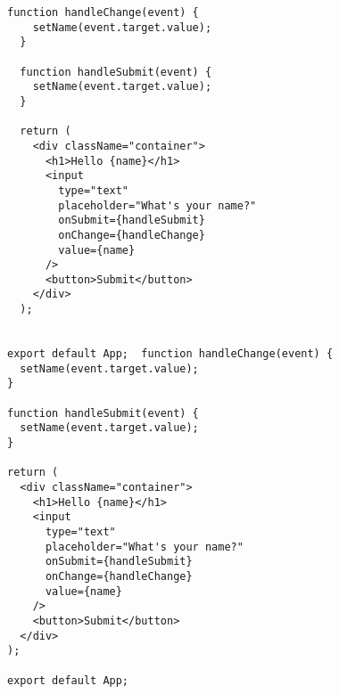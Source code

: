 \documentclass{article}
\begin{document}
\begin{lstlisting}[style=htmlcssjs]
  function handleChange(event) {
    setName(event.target.value);
  }

  function handleSubmit(event) {
    setName(event.target.value);
  }

  return (
    <div className="container">
      <h1>Hello {name}</h1>
      <input
        type="text"
        placeholder="What's your name?"
        onSubmit={handleSubmit}
        onChange={handleChange}
        value={name}
      />
      <button>Submit</button>
    </div>
  );


export default App;  function handleChange(event) {
  setName(event.target.value);
}

function handleSubmit(event) {
  setName(event.target.value);
}

return (
  <div className="container">
    <h1>Hello {name}</h1>
    <input
      type="text"
      placeholder="What's your name?"
      onSubmit={handleSubmit}
      onChange={handleChange}
      value={name}
    />
    <button>Submit</button>
  </div>
);

export default App;

\end{lstlisting}
\end{document}
